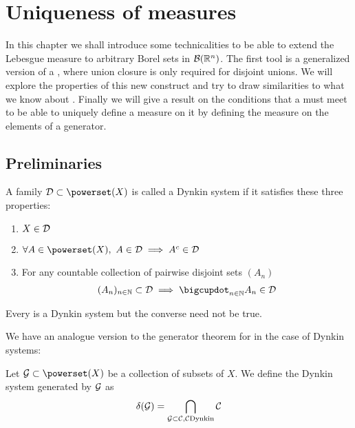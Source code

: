 
\chapter{Uniqueness of measures}

In this chapter we shall introduce some technicalities to be able to extend the Lebesgue measure to arbitrary Borel sets in $\mathcal{B}(\mathbb{R}^n)$. The first tool is a generalized version of a \siga, where union closure is only required for disjoint unions. We will explore the properties of this new construct and try to draw similarities to what we know about \sigas. Finally we will give a result on the conditions that a \siga must meet to be able to uniquely define a measure on it by defining the measure on the elements of a generator.

\section{Preliminaries}


\begin{dfn}
	\label{dfn:dynkin-system}
	A family $\calD \subset \powerset(X)$ is called a Dynkin system if it satisfies these three properties:
	\begin{enumerate}
		\item $X \in \mathcal{D}$
		\item $\forall A \in \powerset(X),\ A \in \calD \implies A^\complement \in \calD$
		\item For any countable collection of pairwise disjoint sets $(A_n)$
		\begin{align*}
			(A_n)_{n\in\N} \subset \calD \implies \bigcupdot_{n \in \N} A_n \in \calD
		\end{align*}
	\end{enumerate}
\end{dfn}

\begin{remark}
	Every \siga is a Dynkin system but the converse need not be true.
\end{remark}


We have an analogue version to the generator theorem for \sigas in the case of Dynkin systems:

\begin{dfn}
	Let $\calG \subset \powerset(X)$ be a collection of subsets of $X$. We define the Dynkin system generated by $\mathcal{G}$ as
	\begin{align*}
		\delta(\mathcal{G}) = \bigcap_{\mathcal{G} \subset \mathcal{C}, \mathcal{C} \text{Dynkin}} \mathcal{C}
	\end{align*}
\end{dfn}

